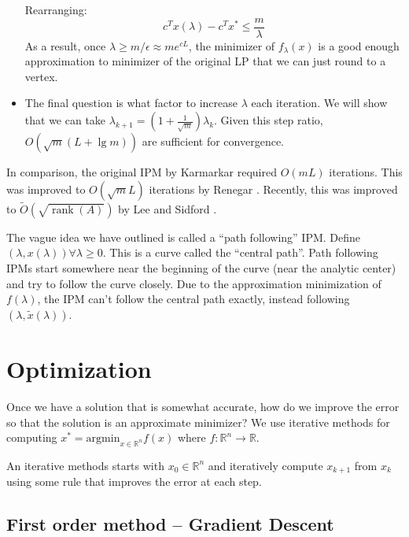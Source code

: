 \documentclass[11pt]{article}
\newcommand{\R}{\mathbb{R}}
\begin{document}
\begin{itemize}
        Rearranging:
        \begin{equation}
            c^Tx(\lambda) -c^Tx^*\leq\frac{m}{\lambda}
        \end{equation}
        As a result, once $\lambda \geq m / \epsilon \approx me^{cL}$, the minimizer of $f_\lambda(x)$ is a good enough approximation to minimizer of the original LP that we can just round to a vertex.
    \item The final question is what factor to increase $\lambda$ each iteration. We will show that we can take $\lambda_{k+1} = (1 + \frac{1}{\sqrt{m}}) \lambda_k$. Given this step ratio, $O(\sqrt{m} (L + \lg{m}))$ are sufficient for convergence.
\end{itemize}

In comparison, the original IPM by Karmarkar\cite{Karmarkar84} required $O(mL)$ iterations. This was improved to $O(\sqrt{m}L)$ iterations by Renegar \cite{Renegar88}. Recently, this was improved to $\widetilde{O}(\sqrt{\mathop{rank}(A)})$ by Lee and Sidford \cite{LeeS13a}.


The vague idea we have outlined is called a ``path following'' IPM. Define $(\lambda, x(\lambda)) \forall \lambda \geq 0$. This is a curve called the ``central path''. Path following IPMs start somewhere near the beginning of the curve (near the analytic center) and try to follow the curve closely. Due to the approximation minimization of $f(\lambda)$, the IPM can't follow the central path exactly, instead following $(\lambda, \tilde{x}(\lambda))$.

\section*{Optimization}

Once we have a solution that is somewhat accurate, how do we improve the error so that the solution is an approximate minimizer? We use iterative methods for computing $x^* = \textrm{argmin}_{x\in \R^n} f(x)$ where $f: \R^n \to \R$. 

An iterative methods starts with $x_0 \in \R^n$ and iteratively compute $x_{k+1}$ from $x_k$ using some rule that improves the error at each step.

\subsection*{First order method -- Gradient Descent}
\end{document}
